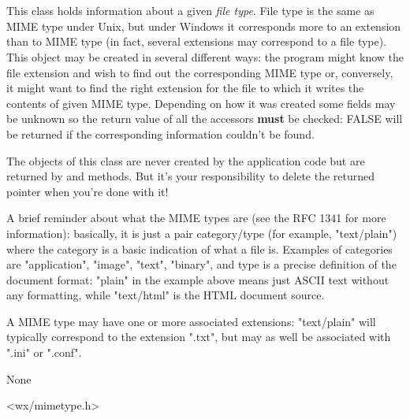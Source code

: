\section{}\label{wxfiletype}

This class holds information about a given {\it file type}. File type is the same as
MIME type under Unix, but under Windows it corresponds more to an extension than
to MIME type (in fact, several extensions may correspond to a file type). This
object may be created in several different ways: the program might know the file
extension and wish to find out the corresponding MIME type or, conversely, it
might want to find the right extension for the file to which it writes the
contents of given MIME type. Depending on how it was created some fields may be
unknown so the return value of all the accessors {\bf must} be checked: FALSE
will be returned if the corresponding information couldn't be found.

The objects of this class are never created by the application code but are
returned by  and 
 methods.
But it's your responsibility to delete the returned pointer when you're done
with it!

A brief reminder about what the MIME types are (see the RFC 1341 for more
information): basically, it is just a pair category/type (for example,
"text/plain") where the category is a basic indication of what a file is.
Examples of categories are "application", "image", "text", "binary", and
type is a precise definition of the document format: "plain" in the example
above means just ASCII text without any formatting, while "text/html" is the
HTML document source.

A MIME type may have one or more associated extensions: "text/plain" will
typically correspond to the extension ".txt", but may as well be associated with
".ini" or ".conf".


None


<wx/mimetype.h>




